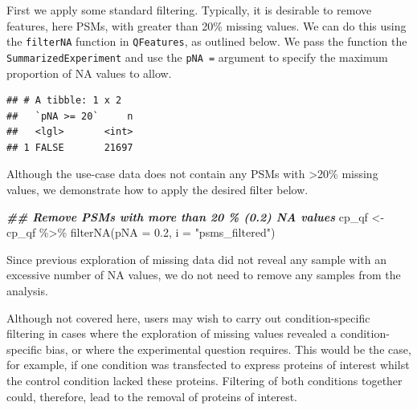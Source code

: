 \documentclass[9pt,a4paper,]{extarticle}
\newenvironment{Shaded}{\begin{snugshade}}{\end{snugshade}}
\newcommand{\AttributeTok}[1]{\textcolor[rgb]{0.77,0.63,0.00}{#1}}
\newcommand{\DecValTok}[1]{\textcolor[rgb]{0.00,0.00,0.81}{#1}}
\newcommand{\DocumentationTok}[1]{\textcolor[rgb]{0.56,0.35,0.01}{\textbf{\textit{#1}}}}
\newcommand{\FloatTok}[1]{\textcolor[rgb]{0.00,0.00,0.81}{#1}}
\newcommand{\FunctionTok}[1]{\textcolor[rgb]{0.00,0.00,0.00}{#1}}
\newcommand{\NormalTok}[1]{#1}
\newcommand{\OtherTok}[1]{\textcolor[rgb]{0.56,0.35,0.01}{#1}}
\newcommand{\SpecialCharTok}[1]{\textcolor[rgb]{0.00,0.00,0.00}{#1}}
\newcommand{\StringTok}[1]{\textcolor[rgb]{0.31,0.60,0.02}{#1}}
\begin{document}
First we apply some standard filtering. Typically, it is desirable to remove
features, here PSMs, with greater than 20\% missing values. We can do this using
the \texttt{filterNA} function in \texttt{QFeatures}, as outlined below. We pass the function
the \texttt{SummarizedExperiment} and use the \texttt{pNA\ =} argument to specify the maximum
proportion of NA values to allow.

\begin{Shaded}
\end{Shaded}

\begin{verbatim}
## # A tibble: 1 x 2
##   `pNA >= 20`     n
##   <lgl>       <int>
## 1 FALSE       21697
\end{verbatim}

Although the use-case data does not contain any PSMs with \textgreater20\% missing values,
we demonstrate how to apply the desired filter below.

\begin{Shaded}
\begin{Highlighting}[]
\DocumentationTok{\#\# Remove PSMs with more than 20 \% (0.2) NA values}
\NormalTok{cp\_qf }\OtherTok{\textless{}{-}}\NormalTok{ cp\_qf }\SpecialCharTok{\%\textgreater{}\%} 
  \FunctionTok{filterNA}\NormalTok{(}\AttributeTok{pNA =} \FloatTok{0.2}\NormalTok{, }
           \AttributeTok{i =} \StringTok{"psms\_filtered"}\NormalTok{)}
\end{Highlighting}
\end{Shaded}

Since previous exploration of missing data did not reveal any sample with an
excessive number of NA values, we do not need to remove any samples from the
analysis.

Although not covered here, users may wish to carry out condition-specific
filtering in cases where the exploration of missing values revealed a condition-
specific bias, or where the experimental question requires. This would be the
case, for example, if one condition was transfected to express proteins of
interest whilst the control condition lacked these proteins. Filtering of both
conditions together could, therefore, lead to the removal of proteins of interest.
\end{document}

